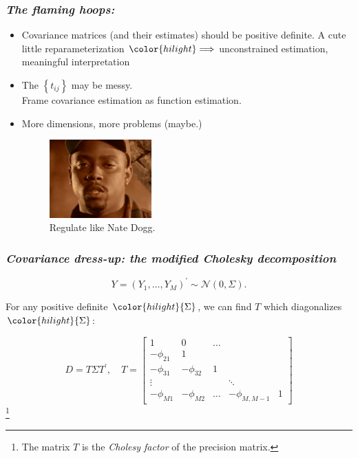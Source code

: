 \documentclass[12pt]{beamer}
\newcommand{\bi}{\begin{itemize}}
\newcommand{\ei}{\end{itemize}}
\newcommand{\newthought}[1]{{\small \color{hilight} {#1}}}
\newcommand\myfootnote[1]{%
  \begingroup
  \renewcommand\thefootnote{}\footnote{#1}%
  \addtocounter{footnote}{-1}%
  \endgroup
}
\begin{document}
\begin{frame}
\frametitle{\emph{The flaming hoops:}}
\bi
\item<4>Covariance matrices (and their estimates) should be positive definite.
	\newthought{A cute little reparameterization } $\color{hilight} \Longrightarrow$ \newthought{unconstrained estimation, meaningful interpretation} 
\item<5> The $\left\{t_{ij} \right\}$ may be messy. \\
	\newthought{Frame covariance estimation as function estimation.} 
\item<6> More dimensions, more problems (maybe.) \\
\begin{figure}
\graphicspath{{img/}}
  \includegraphics[height=3cm]{ripnatedogg}
  \caption{\color{hilight}\small Regulate like Nate Dogg.}
\end{figure}
\ei
\end{frame}




\begin{frame}
\frametitle{\emph{Covariance dress-up: the modified Cholesky decomposition}}

\begin{equation*}
Y = \left(Y_1, \dots, Y_M \right)^\prime \sim \mathcal{N}\left(0,\Sigma\right).
\end{equation*}

\newthought{For any positive definite} $\color{hilight}{\Sigma}$, \newthought{we can find $T$ which diagonalizes} $\color{hilight}{\Sigma}$:

\begin{equation}
D = T \Sigma T^\prime, \quad T = \begin{bmatrix} 1 & 0 & \dots & & \\ -\phi_{21} & 1 & & & \\ -\phi_{31}& -\phi_{32} &  1 & & \\ \vdots & & & \ddots & \\ -\phi_{M1} &-\phi_{M2} & \dots & -\phi_{M,M-1}& 1  \end{bmatrix}
\end{equation}
\myfootnote{The matrix $T$ is the \emph{Cholesy factor}  of the precision matrix.}
\end{frame}
\end{document}
